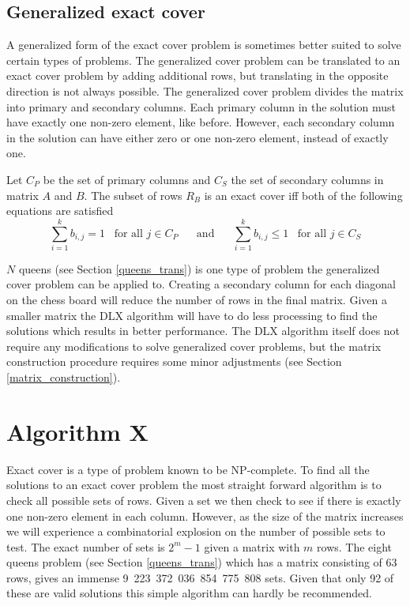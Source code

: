 \subsection{Generalized exact cover}

A generalized form of the exact cover problem is sometimes better suited to solve certain types of problems.
The generalized cover problem can be translated to an exact cover problem by adding additional rows, but translating in the opposite direction is not always possible.
The generalized cover problem divides the matrix into primary and secondary columns.
Each primary column in the solution must have exactly one non-zero element, like before.
However, each secondary column in the solution can have either zero or one non-zero element, instead of exactly one.

Let $C_P$ be the set of primary columns and $C_S$ the set of secondary columns in matrix $A$ and $B$.
The subset of rows $R_B$ is an exact cover iff both of the following equations are satisfied
\[
	\sum_{i = 1}^{k} b_{i,j} = 1 \;\;\; \text{for all } j \in C_P  \;\;\;\;\;\; \text{and} \;\;\;\;\;\;  \sum_{i = 1}^{k} b_{i,j} \leq 1 \;\;\; \text{for all } j \in C_S
\]


$N$ queens (see Section \ref{queens_trans}) is one type of problem the generalized cover problem can be applied to.
Creating a secondary column for each diagonal on the chess board will reduce the number of rows in the final matrix.
Given a smaller matrix the DLX algorithm will have to do less processing to find the solutions which results in better performance.
The DLX algorithm itself does not require any modifications to solve generalized cover problems, but the matrix construction procedure requires some minor adjustments (see Section \ref{matrix_construction}).



\section{Algorithm X}
\label{algox}

Exact cover is a type of problem known to be NP-complete.
To find all the solutions to an exact cover problem the most straight forward algorithm is to check all possible sets of rows.
Given a set we then check to see if there is exactly one non-zero element in each column.
However, as the size of the matrix increases we will experience a combinatorial explosion on the number of possible sets to test.
The exact number of sets is $2^{m}-1$ given a matrix with $m$ rows.
The eight queens problem (see Section \ref{queens_trans}) which has a matrix consisting of 63 rows, gives an immense 9~223~372~036~854~775~808 sets.
Given that only 92 of these are valid solutions this simple algorithm can hardly be recommended.

